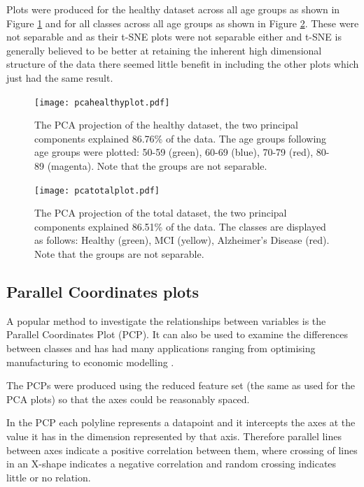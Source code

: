 Plots were produced for the healthy dataset across all age groups as shown in Figure \ref{fig:pcahealthyplot} and for all classes across all age groups as shown in Figure \ref{fig:pcatotalplot}. These were not separable and as their t-SNE plots were not separable either and t-SNE is generally believed to be better at retaining the inherent high dimensional structure of the data\cite{Bushati2011} there seemed little benefit in including the other plots which just had the same result.

\begin{figure}[h!]
  \centering
    \texttt{[image: pcahealthyplot.pdf]}
    \caption{The PCA projection of the healthy dataset, the two principal components explained 86.76\% of the data. The age groups following age groups were plotted: 50-59 (green), 60-69 (blue), 70-79 (red), 80-89 (magenta). Note that the groups are not separable.}
    \label{fig:pcahealthyplot}
\end{figure}

\begin{figure}[h!]
  \centering
    \texttt{[image: pcatotalplot.pdf]}
    \caption{The PCA projection of the total dataset, the two principal components explained 86.51\% of the data. The classes are displayed as follows: Healthy (green), MCI (yellow), Alzheimer's Disease (red). Note that the groups are not separable.}
    \label{fig:pcatotalplot}
\end{figure}



\subsection{Parallel Coordinates plots}

A popular method to investigate the relationships between variables is the Parallel Coordinates Plot (PCP). It can also be used to examine the differences between classes and has had many applications ranging from optimising manufacturing to economic modelling \cite{Inselberg1997}.

The PCPs were produced using the reduced feature set (the same as used for the PCA plots) so that the axes could be reasonably spaced.

In the PCP each polyline represents a datapoint and it intercepts the axes at the value it has in the dimension represented by that axis. Therefore parallel lines between axes indicate a positive correlation between them, where crossing of lines in an X-shape indicates a negative correlation and random crossing indicates little or no relation.\cite{Inselberg1997}

